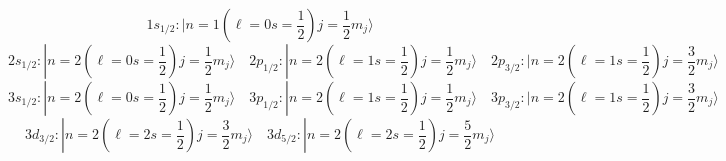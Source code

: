 \[ 1s_{1/2}: |n=1 \left(\ell = 0 s = \frac{1}{2}\right) j = \frac{1}{2}m_j
\rangle \] 
\[ 2s_{1/2}: |n=2 \left( \ell = 0 s = \frac{1}{2} \right) j = \frac{1}{2} m_j
  \rangle \quad 2p_{1/2}: |n = 2 \left( \ell=1 s = \frac{1}{2} \right)
  j = \frac{1}{2} m_j \rangle \quad 2p_{3/2}: |n = 2 \left( \ell
= 1 s = \frac{1}{2} \right) j = \frac{3}{2}m_j \rangle \] 
\[ 3s_{1/2}: |n = 2 \left(\ell = 0 s = \frac{1}{2} \right) j = \frac{1}{2}m_j
  \rangle \quad 3p_{1/2}: |n = 2 \left( \ell = 1 s = \frac{1}{2} \right)
  j = \frac{1}{2} m_j \rangle \quad 3p_{3/2}: |n=2 \left(\ell
= 1 s = \frac{1}{2} \right) j = \frac{3}{2}m_j \rangle \] 
\[ 3d_{3/2}: |n=2 \left( \ell = 2 s = \frac{1}{2} \right) j = \frac{3}{2}m_j
  \rangle \quad 3d_{5/2}: |n = 2 \left(\ell = 2s=\frac{1}{2}\right)
j = \frac{5}{2} m_j \rangle \] \vspace{3px} 

